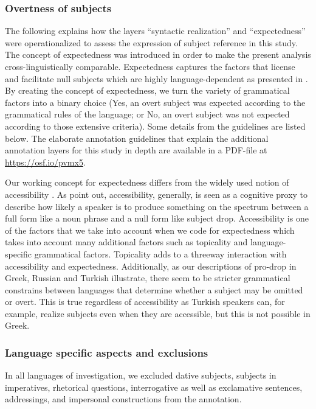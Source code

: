 \documentclass[output=paper,colorlinks,citecolor=brown]{langscibook}
\begin{document}
\subsubsection{Overtness of subjects}

The following explains how the layers ``syntactic realization'' and ``expectedness'' were operationalized to assess the expression of subject reference in this study. The concept of expectedness was introduced in order to make the present analysis cross-linguistically comparable. Expectedness captures the factors that license and facilitate null subjects which are highly language-dependent as presented in . By creating the concept of expectedness, we turn the variety of grammatical factors into a binary choice (Yes, an overt subject was expected according to the grammatical rules of the language; or No, an overt subject was not expected according to those extensive criteria). Some details from the guidelines are listed below. The elaborate annotation guidelines that explain the additional annotation layers for this study in depth are available in a PDF-file at \url{https://osf.io/pvmx5}.

Our working concept for expectedness differs from the widely used notion of accessibility \parencite{chafe1987cognitive, gundel1993cognitive, ariel2001accessibility, arnold2010speakers}. As \textcite{allen2015role} point out, accessibility, generally, is seen as a cognitive proxy to describe how likely a speaker is to produce something on the spectrum between a full form like a noun phrase and a null form like subject drop. Accessibility is one of the factors that we take into account when we code for expectedness which takes into account many additional factors such as topicality and language-specific grammatical factors. Topicality adds to a threeway interaction with accessibility and expectedness. Additionally, as our descriptions of pro-drop in Greek, Russian and Turkish illustrate, there seem to be stricter grammatical constrains between languages that determine whether a subject may be omitted or overt. This is true regardless of accessibility as Turkish speakers can, for example, realize subjects even when they are accessible, but this is not possible in Greek.

\subsubsection{Language specific aspects and exclusions}

In all languages of investigation, we excluded dative subjects, subjects in imperatives, rhetorical questions, interrogative as well as exclamative sentences, addressings, and impersonal constructions from the annotation.
\end{document}
